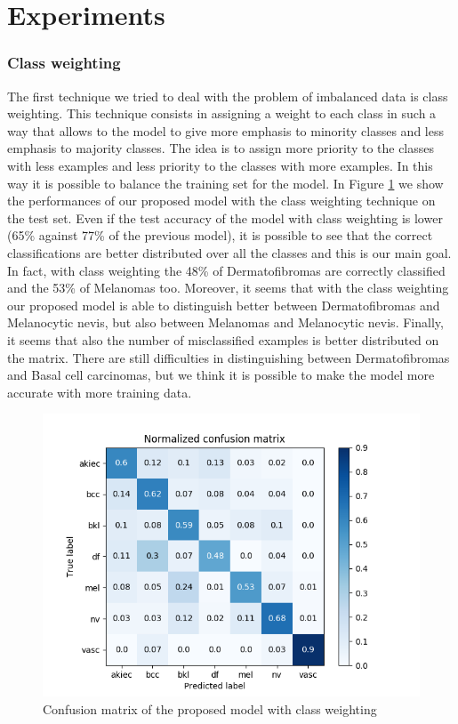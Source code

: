 \section{Experiments} \label{experiments}
		
	\subsubsection{Class weighting}
	
		The first technique we tried to deal with the problem of imbalanced data is class weighting. This technique consists in assigning a weight to each class in such a way that allows to the model to give more emphasis to minority classes and less emphasis to majority classes. The idea is to assign more priority to the classes with less examples and less priority to the classes with more examples. In this way it is possible to balance the training set for the model. 
		In Figure \ref{fig:second-matrix} we show the performances of our proposed model with the class weighting technique on the test set.
		Even if the test accuracy of the model with class weighting is lower (65\% against 77\% of the previous model), it is possible to see that the correct classifications are better distributed over all the classes and this is our main goal. In fact, with class weighting the 48\% of Dermatofibromas are correctly classified and the 53\% of Melanomas too. Moreover, it seems that with the class weighting our proposed model is able to distinguish better between Dermatofibromas and Melanocytic nevis, but also between Melanomas and Melanocytic nevis. Finally, it seems that also the number of misclassified examples is better distributed on the matrix. There are still difficulties in distinguishing between Dermatofibromas and Basal cell carcinomas, but we think it is possible to make the model more accurate with more training data.
		
		\begin{figure}[H]
			\centering
			\includegraphics[width=15cm]{images/secondMatrix.png}
			\caption{Confusion matrix of the proposed model with class weighting}
			\label{fig:second-matrix}
		\end{figure}
		
